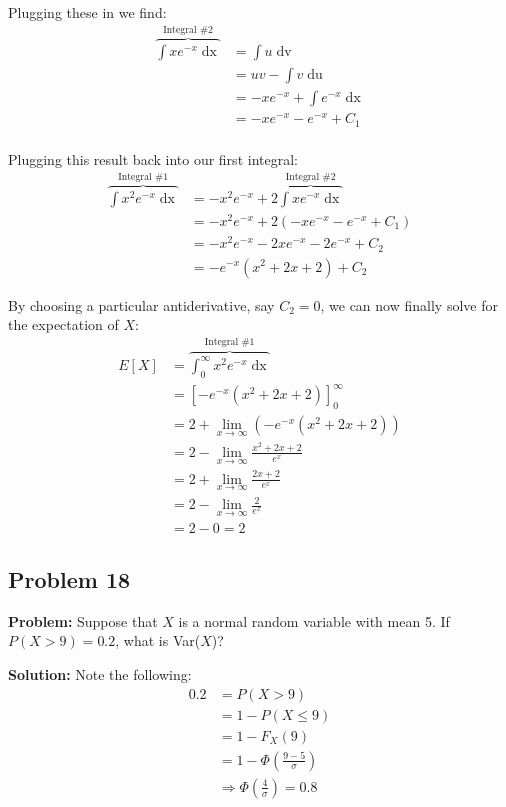 \documentclass{article}
\newcommand*\eval[3]{\left[#1\right]_{#2}^{#3}}
\begin{document}
Plugging these in we find:
\begin{align*}
    \overbrace{\int xe^{-x}\mathop{dx}}^{\text{Integral \#2}}&=\int u\mathop{dv}\tag{change of variables}\\
    &=uv-\int v\mathop{du}\tag{integration by parts}\\
    &=-xe^{-x}+\int e^{-x}\mathop{dx}\tag{change of variables}\\
    &=-xe^{-x}-e^{-x}+C_1\\
\end{align*}

Plugging this result back into our first integral:
\begin{align*}
    \overbrace{\int x^2e^{-x}\mathop{dx}}^{\text{Integral \#1}}&=-x^2e^{-x}+2\overbrace{\int xe^{-x}\mathop{dx}}^{\text{Integral \#2}}\\
    &=-x^2e^{-x}+2(-xe^{-x}-e^{-x}+C_1)\\
    &=-x^2e^{-x}-2xe^{-x}-2e^{-x}+C_2\\
    &=-e^{-x}(x^2+2x+2)+C_2
\end{align*}

By choosing a particular antiderivative, say $C_2=0$, we can now finally solve for the expectation of $X$:
\begin{align*}
    E[X]&=\overbrace{\int_0^\infty x^2e^{-x}\mathop{dx}}^{\text{Integral \#1}}\\
    &=\eval{-e^{-x}(x^2+2x+2)}{0}{\infty}\\
    &=2+\lim_{x\to\infty}(-e^{-x}(x^2+2x+2))\\
    &=2-\lim_{x\to\infty}\frac{x^2+2x+2}{e^{x}}\\
    &=2+\lim_{x\to\infty}\frac{2x+2}{e^{x}}\tag{L'Hôpital's rule}\\
    &=2-\lim_{x\to\infty}\frac{2}{e^{x}}\tag{L'Hôpital's rule}\\
    &=2-0=2
\end{align*}

\subsection*{Problem 18}
\noindent\textbf{Problem:} Suppose that $X$ is a normal random variable with mean 5. If $P(X>9)=0.2$, what is Var($X$)?
\bigskip

\noindent\textbf{Solution:} Note the following:
\begin{align*}
    0.2&=P(X>9)\\
    &=1-P(X\le 9)\tag{complement}\\
    &=1-F_X(9)\tag{def. of cdf}\\
    &=1-\Phi\left(\frac{9-5}{\sigma}\right)\tag{unit normal random variable}\\
    &\Rightarrow\Phi\left(\frac{4}{\sigma}\right)=0.8
\end{align*}
\end{document}
